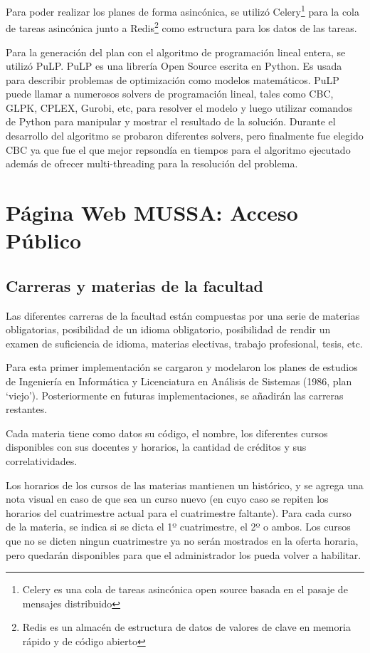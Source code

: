 \documentclass[a4paper]{article}
\begin{document}
Para poder realizar los planes de forma asincónica, se utilizó Celery\footnote{Celery es una cola de tareas asincónica open source basada en el pasaje de mensajes distribuido}\cite{CELERY} para la cola de tareas asincónica junto a Redis\footnote{Redis es un almacén de estructura de datos de valores de clave en memoria rápido y de código abierto}\cite{REDIS} como estructura para los datos de las tareas.\newline

Para la generación del plan con el algoritmo de programación lineal entera, se utilizó PuLP\cite{PULP_PYTHON}. PuLP es una librería Open Source escrita en Python. Es usada para describir problemas de optimización como modelos matemáticos. PuLP puede llamar a numerosos solvers de programación lineal, tales como CBC, GLPK, CPLEX, Gurobi, etc, para resolver el modelo y luego utilizar comandos de Python para manipular y mostrar el resultado de la solución. Durante el desarrollo del algoritmo se probaron diferentes solvers, pero finalmente fue elegido CBC ya que fue el que mejor repsondía en tiempos para el algoritmo ejecutado además de ofrecer multi-threading para la resolución del problema.

\newpage
\section{Página Web MUSSA: Acceso Público}

\subsection{Carreras y materias de la facultad}

Las diferentes carreras de la facultad están compuestas por una serie de materias obligatorias, posibilidad de un idioma obligatorio, posibilidad de rendir un examen de suficiencia de idioma, materias electivas, trabajo profesional, tesis, etc.

Para esta primer implementación se cargaron y modelaron los planes de estudios de Ingeniería en Informática y Licenciatura en Análisis de Sistemas (1986, plan `viejo'). Posteriormente en futuras implementaciones, se añadirán las carreras restantes.\newline

Cada materia tiene como datos su código, el nombre, los diferentes cursos disponibles con sus docentes y horarios, la cantidad de créditos y sus correlatividades.

Los horarios de los cursos de las materias mantienen un histórico, y se agrega una nota visual en caso de que sea un curso nuevo (en cuyo caso se repiten los horarios del cuatrimestre actual para el cuatrimestre faltante). Para cada curso de la materia, se indica si se dicta el 1º cuatrimestre, el 2º o ambos. Los cursos que no se dicten ningun cuatrimestre ya no serán mostrados en la oferta horaria, pero quedarán disponibles para que el administrador los pueda volver a habilitar.
\end{document}
